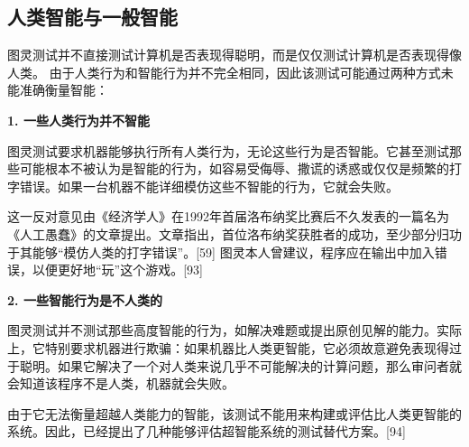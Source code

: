 \subsection{人类智能与一般智能}
图灵测试并不直接测试计算机是否表现得聪明，而是仅仅测试计算机是否表现得像人类。 由于人类行为和智能行为并不完全相同，因此该测试可能通过两种方式未能准确衡量智能：

\textbf{1. 一些人类行为并不智能}

图灵测试要求机器能够执行所有人类行为，无论这些行为是否智能。它甚至测试那些可能根本不被认为是智能的行为，如容易受侮辱、撒谎的诱惑或仅仅是频繁的打字错误。如果一台机器不能详细模仿这些不智能的行为，它就会失败。

这一反对意见由《经济学人》在1992年首届洛布纳奖比赛后不久发表的一篇名为《人工愚蠢》的文章提出。文章指出，首位洛布纳奖获胜者的成功，至少部分归功于其能够“模仿人类的打字错误”。[59] 图灵本人曾建议，程序应在输出中加入错误，以便更好地“玩”这个游戏。[93]

\textbf{2. 一些智能行为是不人类的}

图灵测试并不测试那些高度智能的行为，如解决难题或提出原创见解的能力。实际上，它特别要求机器进行欺骗：如果机器比人类更智能，它必须故意避免表现得过于聪明。如果它解决了一个对人类来说几乎不可能解决的计算问题，那么审问者就会知道该程序不是人类，机器就会失败。

由于它无法衡量超越人类能力的智能，该测试不能用来构建或评估比人类更智能的系统。因此，已经提出了几种能够评估超智能系统的测试替代方案。[94]